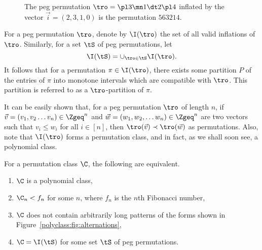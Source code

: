 \documentclass[12pt,twoside]{memoir}
\begin{document}
\begin{figure}[t]
      \caption{The peg permutation $\tro = \pl3 \mn1 \dt2 \pl4$ inflated by the
      vector $\vec{i} = (2,3,1,0)$ is the permutation $563214$.}
      \label{polyclass:fig:inflation}
      \end{figure}
      
      \begin{definition} \label{polyclass:def:inflations}
        For a peg permutation $\tro$, denote by $\I(\tro)$ the set of all valid
        inflations of $\tro$. Similarly, for a set $\tS$ of peg permutations, let 
        $$ \I(\tS) = \cup_{\tro \in \tS} \I(\tro).$$
        It follows that for a permutation $\pi \in \I(\tro)$, there exists some
        partition $P$ of the entries of $\pi$ into monotone intervals which are
        compatible with $\tro$. This partition is referred to as a
        $\tro$-partition of $\pi$. 
      \end{definition}

      It can be easily shown that, for a peg permutation $\tro$ of length $n$, if
      $\vec v = (v_1, v_2 \dots v_n) \in \Zgeq^n$ and $\vec w = (w_1, w_2, \dots
      w_n) \in \Zgeq^n$ are two vectors such that $v_i \leq w_i$ for all $i \in [n]$,
      then $\tro(\vec v) \prec \tro(\vec w)$ as permutations. Also, note that
      $\I(\tro)$ forms a permutation class, and in fact, as we shall soon see, a
      polynomial class. 

      \begin{theorem} \label{polyclass:thm:tfae}
        For a permutation class $\C$, the following are equivalent. 
        \begin{enumerate}[1)]
          \item $\C$ is a polynomial class,
          \item $\C_n < f_n$ for some $n$, where $f_n$ is the $n$th Fibonacci
          number,
          \item $\C$ does not contain arbitrarily long patterns of the forms
          shown in Figure~\ref{polyclass:fig:alternations},
          \item $\C = \I(\tS)$ for some set $\tS$ of peg permutations. 
        \end{enumerate}
      \end{theorem}
\end{document}

